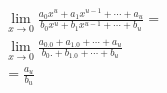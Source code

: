 \begin{ex}
\begin{align}
&\lim_{x\rightarrow 0} \frac{a_0x^u+a_1x^{u-1}+\cdots+a_u}{b_0x^u+b_1x^{u-1}+\cdots+b_u}=\nonumber\\
&\lim_{x\rightarrow 0} \frac{a_0.0+a_1.0+\cdots+a_u}{b_0.+b_1.0+\cdots+b_u} \nonumber\\ 
&=\frac{a_u}{b_u} \nonumber
\end{align}
\end{ex}